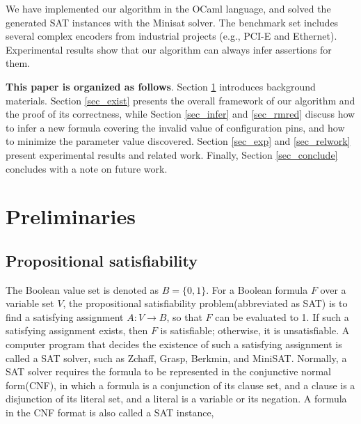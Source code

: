 \documentclass{acm_proc_article-sp}
\begin{document}
We have implemented our algorithm in the OCaml language,
and solved the generated SAT instances with the Minisat solver\cite{EXTSAT}.
The benchmark set includes several complex encoders from industrial projects
(e.g.,
PCI-E\cite{PCIESPEC} and Ethernet\cite{IEEE80232002}).
Experimental results show that
our algorithm can always infer assertions for them.


\textbf{This paper is organized as follows}.
Section \ref{sec_prem} introduces background materials.
Section \ref{sec_exist} presents the overall framework of our algorithm
and the proof of its correctness,
while Section \ref{sec_infer} and \ref{sec_rmred} discuss how to infer a new formula covering the invalid value of configuration pins,
and how to minimize the parameter value discovered.
Section \ref{sec_exp} and \ref{sec_relwork} present experimental results and related work.
Finally,
Section \ref{sec_conclude} concludes with a note on future work.

\section{Preliminaries}\label{sec_prem}

\subsection{Propositional satisfiability}\label{subsec_SAT}
The Boolean value set is denoted as $B=\{0,1\}$.
For a Boolean formula $F$ over a variable set $V$,
the propositional satisfiability problem(abbreviated as SAT) is to find a satisfying assignment $A:V\to B$,
so that $F$ can be evaluated to 1.
If such a satisfying assignment exists, then $F$ is satisfiable;
otherwise,
it is unsatisfiable.
A computer program that decides the existence of such a satisfying assignment is called a SAT solver,
 such as Zchaff\cite{CHAFF},
 Grasp\cite{grasp},
 Berkmin\cite{BERKMIN},
 and MiniSAT\cite{EXTSAT}.
Normally,
a SAT solver requires the formula to be represented in the conjunctive normal form(CNF),
in which a formula is a conjunction of its clause set,
and a clause is a disjunction of its literal set,
and a literal is a variable or its negation.
A formula in the CNF format is also called a SAT instance,
\end{document}
